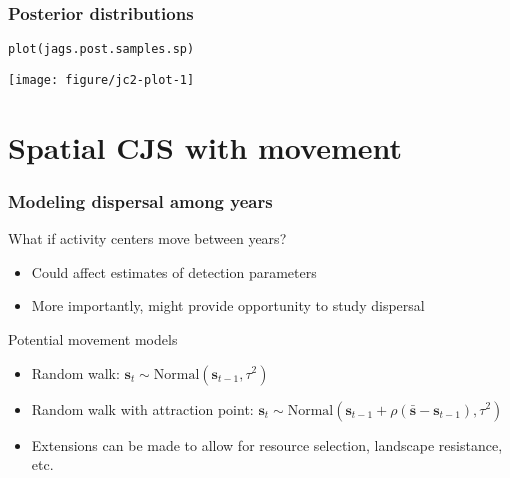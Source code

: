 \documentclass[color=usenames,dvipsnames]{beamer}\usepackage[]{graphicx}\usepackage[]{xcolor}
\makeatletter
\newcommand{\hldef}[1]{\textcolor[rgb]{0,0,0}{#1}}%
\newcommand{\hlkwd}[1]{\textcolor[rgb]{0.004,0.004,0.506}{#1}}%
\newenvironment{kframe}{%
 \def\at@end@of@kframe{}%
 \ifinner\ifhmode%
  \def\at@end@of@kframe{\end{minipage}}%
  \begin{minipage}{\columnwidth}%
 \fi\fi%
 \def\FrameCommand##1{\hskip\@totalleftmargin \hskip-\fboxsep
 \colorbox{shadecolor}{##1}\hskip-\fboxsep
     \hskip-\linewidth \hskip-\@totalleftmargin \hskip\columnwidth}%
 \MakeFramed {\advance\hsize-\width
   \@totalleftmargin\z@ \linewidth\hsize
   \@setminipage}}%
 {\par\unskip\endMakeFramed%
 \at@end@of@kframe}
\newenvironment{knitrout}{}{} %
\makeatother
\begin{document}
\begin{frame}[fragile]
  \frametitle{Posterior distributions}
\begin{knitrout}\scriptsize
{}\color{fgcolor}\begin{kframe}
\begin{alltt}
\hlkwd{plot}\hldef{(jags.post.samples.sp)}
\end{alltt}
\end{kframe}

{\centering \texttt{[image: figure/jc2-plot-1]} 

}


\end{knitrout}
\end{frame}










\section{Spatial CJS with movement}









\begin{frame}
  \frametitle{Modeling dispersal among years}
  {\large What if activity centers move between years?}
  \begin{itemize}
    \normalsize
    \item Could affect estimates of detection parameters
    \item More importantly, might provide opportunity to study dispersal
  \end{itemize}
  \pause
  \vfill
  {\large Potential movement models}
  \begin{itemize}
    \normalsize
    \item Random walk: ${\bm s}_t \sim \mbox{Normal}({\bm s}_{t-1}, \tau^2)$
    \item Random walk with attraction point: ${\bm s}_t \sim \mbox{Normal}({\bm  s}_{t-1} + \rho(\bar{\bm s} - {\bm s}_{t-1}), \tau^2)$
    \item Extensions can be made to allow for resource selection,
      landscape resistance, etc.%
  \end{itemize}
\end{frame}
\end{document}
